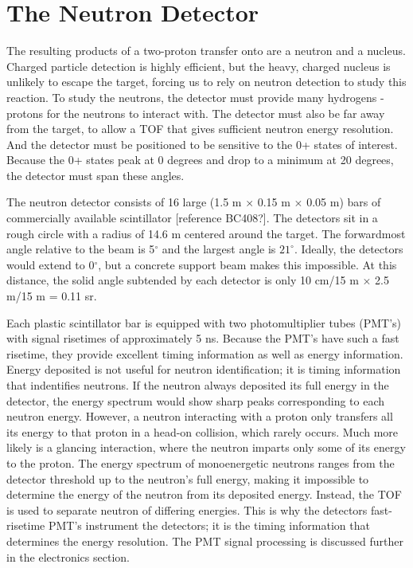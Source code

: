\section{The Neutron Detector}

The resulting products of a two-proton transfer onto  are a neutron and a  nucleus.  Charged particle detection is highly efficient, but the heavy, charged  nucleus is unlikely to escape the target, forcing us to rely on neutron detection to study this reaction. To study the neutrons, the detector must provide many hydrogens - protons for the neutrons to interact with.  The detector must also be far away from the target, to allow a TOF that gives sufficient neutron energy resolution.  And the detector must be positioned to be sensitive to the 0+ states of interest.  Because the 0+ states peak at 0 degrees and drop to a minimum at 20 degrees, the detector must span these angles.

The neutron detector consists of 16 large (1.5 m $\times$ 0.15 m $\times$ 0.05 m) bars of commercially available scintillator [reference BC408?].  The detectors sit in a rough circle with a radius of 14.6 m centered around the target.  The forwardmost angle relative to the beam is 5$^{\circ}$ and the largest angle is $21^{\circ}$.  Ideally, the detectors would extend to 0$^{\circ}$, but a concrete support beam makes this impossible.  At this distance, the solid angle subtended by each detector is only 10 cm/15 m $\times$ 2.5 m/15 m = 0.11 sr.


Each plastic scintillator bar is equipped with two photomultiplier tubes (PMT's) with signal risetimes of approximately 5 ns.  Because the PMT's have such a fast risetime, they provide excellent timing information as well as energy information.  Energy deposited is not useful for neutron identification; it is timing information that indentifies neutrons.  If the neutron always deposited its full energy in the detector, the energy spectrum would show sharp peaks corresponding to each neutron energy.  However, a neutron interacting with a proton only transfers all its energy to that proton in a head-on collision, which rarely occurs.  Much more likely is a glancing interaction, where the neutron imparts only some of its energy to the proton.  The energy spectrum of monoenergetic neutrons ranges from the detector threshold up to the neutron's full energy, making it impossible to determine the energy of the neutron from its deposited energy.  Instead, the TOF is used to separate neutron of differing energies.  This is why the detectors fast-risetime PMT's instrument the detectors; it is the timing information that determines the energy resolution.  The PMT signal processing is discussed further in the electronics section.

